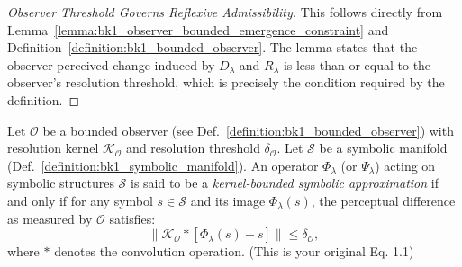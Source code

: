 \begin{proof}[Observer Threshold Governs Reflexive Admissibility]
\label{proof:bk1_observer_threshold_reflexivity}
This follows directly from Lemma~\ref{lemma:bk1_observer_bounded_emergence_constraint} and Definition~\ref{definition:bk1_bounded_observer}. The lemma states that the observer-perceived change induced by $D_\lambda$ and $R_\lambda$ is less than or equal to the observer's resolution threshold, which is precisely the condition required by the definition.
\end{proof}
\begin{definition}
\label{definition:bk1_kernel_based_bounded_symbolic_approximation}
Let $\mathcal{O}$ be a bounded observer (see Def.~\ref{definition:bk1_bounded_observer}) with resolution kernel $\mathcal{K}_\mathcal{O}$ and resolution threshold $\delta_\mathcal{O}$. Let $\mathcal{S}$ be a symbolic manifold (Def.~\ref{definition:bk1_symbolic_manifold}). An operator $\Phi_\lambda$ (or $\Psi_\lambda$) acting on symbolic structures $\mathcal{S}$ is said to be a \emph{kernel-bounded symbolic approximation} if and only if for any symbol $s \in \mathcal{S}$ and its image $\Phi_\lambda(s)$, the perceptual difference as measured by $\mathcal{O}$ satisfies:
\begin{equation}
\|\mathcal{K}_\mathcal{O} \ast [\Phi_\lambda(s) - s]\| \leq \delta_\mathcal{O},
\end{equation}
where $\ast$ denotes the convolution operation. (This is your original Eq. 1.1)
\end{definition}
